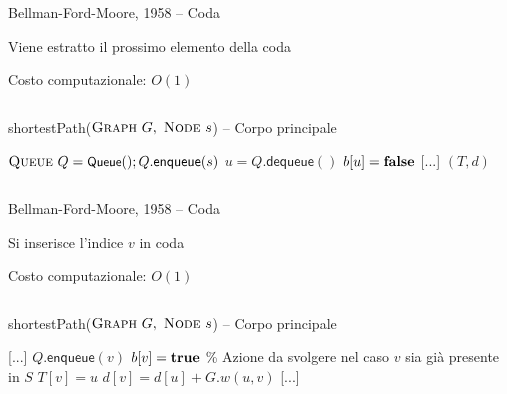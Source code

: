 \begin{frame}{Bellman-Ford-Moore, 1958 -- Coda}

\vspace{-9pt}
\begin{myboxtitle}
\BI
\item Viene estratto il prossimo elemento della coda
\item Costo computazionale: $O(1)$
\EI
\end{myboxtitle}

\vspace{-18pt}
\begin{columns}
\small
\begin{Procedure}
\caption[A]{\textsf{shortestPath}($\textsc{Graph}\ G,\ \textsc{Node}\ s$) -- Corpo principale}
$\textsc{Queue}\ Q = \textsf{{\small Queue}}(); Q.\textsf{enqueue}(s)$\;
{
  \alert{$u = Q.\textsf{dequeue}()$}\;
  $b[u] = \FALSE$\;
  {
    {
      [...]
    }
  }
}
\Return $(T,d)$
\end{Procedure}
\end{columns}

\end{frame}

\begin{frame}{Bellman-Ford-Moore, 1958 -- Coda}

\vspace{-9pt}
\begin{myboxtitle}
\BI
\item Si inserisce l'indice $v$ in coda
\item Costo computazionale: $O(1)$
\EI
\end{myboxtitle}

\vspace{-18pt}
\begin{columns}
\small
\begin{Procedure}
\caption[A]{\textsf{shortestPath}($\textsc{Graph}\ G,\ \textsc{Node}\ s$) -- Corpo principale}
[...]\;
    {
      {
        \alert{$Q.\textsf{enqueue}(v)$}\;
        $b[v] = \TRUE$\;
      }
      {
        \% Azione da svolgere nel caso $v$ sia già presente in $S$
      }
      $T[v] = u$\;
      $d[v] = d[u] + G.w(u,v)$\;
    }
[...]\;
\end{Procedure}
\end{columns}

\end{frame}


